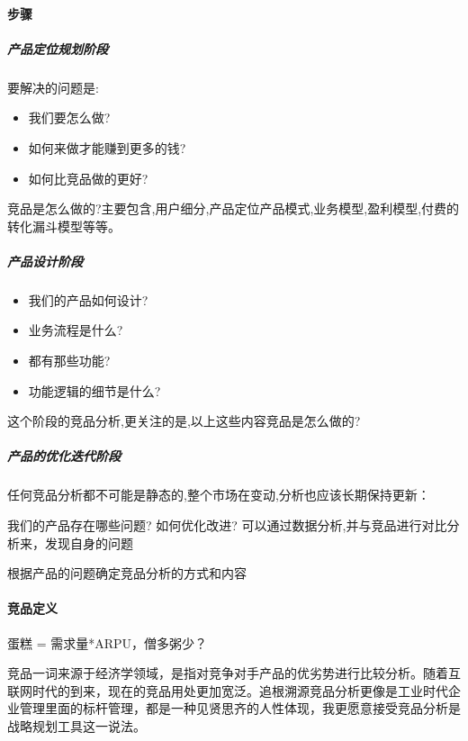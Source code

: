 \documentclass[letterpaper,11pt,english]{sphinxmanual}
\begin{document}
\paragraph{步骤}
\label{\detokenize{chapter_skill/goods_analysis:id5}}

\subparagraph{产品定位规划阶段}
\label{\detokenize{chapter_skill/goods_analysis:id6}}
要解决的问题是:
\begin{itemize}
\item {} 
我们要怎么做?

\item {} 
如何来做才能赚到更多的钱?

\item {} 
如何比竞品做的更好?

\end{itemize}

竞品是怎么做的?主要包含,用户细分,产品定位产品模式,业务模型,盈利模型,付费的转化漏斗模型等等。


\subparagraph{产品设计阶段}
\label{\detokenize{chapter_skill/goods_analysis:id7}}\begin{itemize}
\item {} 
我们的产品如何设计?

\item {} 
业务流程是什么?

\item {} 
都有那些功能?

\item {} 
功能逻辑的细节是什么?

\end{itemize}

这个阶段的竞品分析,更关注的是,以上这些内容竞品是怎么做的?


\subparagraph{产品的优化迭代阶段}
\label{\detokenize{chapter_skill/goods_analysis:id8}}
任何竞品分析都不可能是静态的,整个市场在变动,分析也应该长期保持更新：

我们的产品存在哪些问题? 如何优化改进?
可以通过数据分析,并与竞品进行对比分析来，发现自身的问题

根据产品的问题确定竞品分析的方式和内容


\paragraph{竞品定义}
\label{\detokenize{chapter_skill/goods_analysis:id9}}
蛋糕 = 需求量*ARPU，僧多粥少？

竞品一词来源于经济学领域，是指对竞争对手产品的优劣势进行比较分析。随着互联网时代的到来，现在的竞品用处更加宽泛。追根溯源竞品分析更像是工业时代企业管理里面的标杆管理，都是一种见贤思齐的人性体现，我更愿意接受竞品分析是战略规划工具这一说法。
\end{document}
